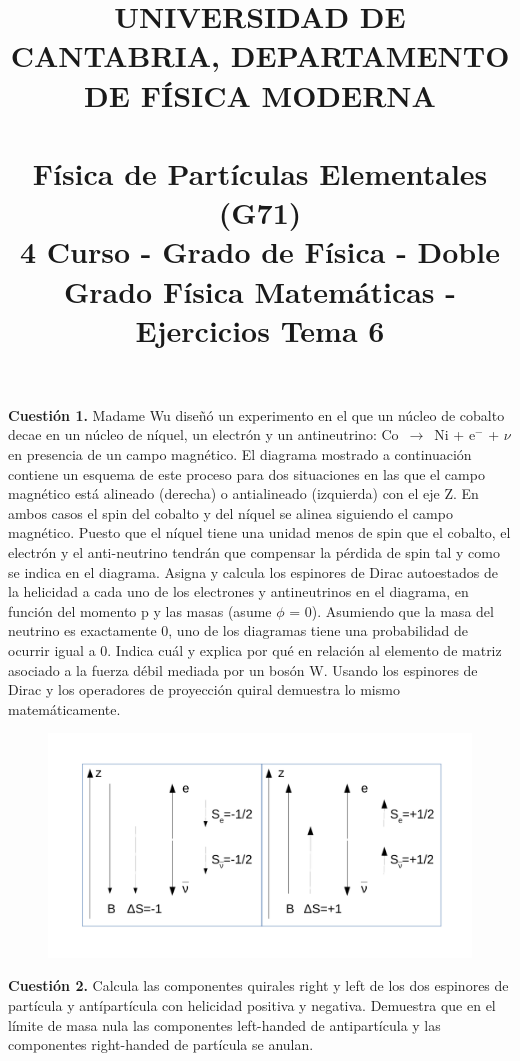 \documentclass[paper=a4, fontsize=11pt]{scrartcl} %
\date{}
\title{	
\normalfont \normalsize 
\textsc{UNIVERSIDAD DE CANTABRIA, DEPARTAMENTO DE FÍSICA MODERNA} \\ [20pt] %
\horrule{0.5pt} \\[0.4cm] %
\huge Física de Partículas Elementales (G71) \\ %
\normalsize 4 Curso - Grado de Física - Doble Grado Física Matemáticas - Ejercicios Tema 6
\horrule{2pt} \\[0.5cm] %
}
\numberwithin{equation}{section} %
\numberwithin{figure}{section} %
\numberwithin{table}{section} %
\begin{document}
\maketitle %

\vspace{-2.5cm}

\textbf{Cuestión 1.} Madame Wu diseñó un experimento en el que un núcleo de cobalto decae en un núcleo de
níquel, un electrón y un antineutrino: Co~$\rightarrow$~Ni + e$^{-}$ + $\nu$ en presencia de un campo magnético. El diagrama
mostrado a continuación contiene un esquema de este proceso para dos situaciones en las que el campo magnético está alineado
(derecha) o antialineado (izquierda) con el eje Z. En ambos casos el spin del cobalto y del níquel se alinea siguiendo el campo magnético. Puesto
que el níquel tiene una unidad menos de spin que el cobalto, el electrón y el anti-neutrino tendrán que compensar la pérdida de spin tal
y como se indica en el diagrama. Asigna y calcula los espinores de Dirac autoestados de la helicidad a cada uno de los electrones y antineutrinos en el
diagrama, en función del momento p y las masas (asume $\phi$ = 0). Asumiendo que la masa del neutrino es exactamente 0, uno de los diagramas tiene
una probabilidad de ocurrir igual a 0. Indica cuál y explica por qué en relación al elemento de matriz asociado a la fuerza débil mediada por un
bosón W. Usando los espinores de Dirac y los operadores de proyección quiral demuestra lo mismo matemáticamente. 

\begin{figure}[!h]
\begin{center}
\includegraphics[width=0.6\linewidth]{DibujoExamen.pdf}
\end{center}
\end{figure}

\textbf{Cuestión 2.} Calcula las componentes quirales right y left de los dos espinores de partícula y antípartícula con helicidad positiva y negativa. Demuestra que en el límite de masa nula las
componentes left-handed de antipartícula y las componentes right-handed de partícula se anulan.
\\
\\
  
\end{document}
